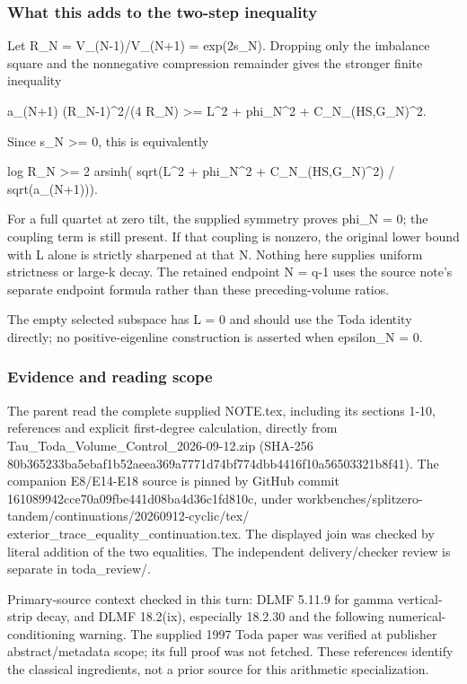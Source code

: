 \subsubsection{What this adds to the two-step
inequality}\label{toda_parent_join:what-this-adds-to-the-two-step-inequality}

Let R\_N = V\_(N-1)/V\_(N+1) = exp(2s\_N). Dropping only the imbalance square and the nonnegative
compression remainder gives the stronger finite inequality

a\_(N+1) (R\_N-1)\^{}2/(4 R\_N) \textgreater= L\^{}2 + phi\_N\^{}2 +
\textbar\textbar C\_N\textbar\textbar\_(HS,G\_N)\^{}2.

Since s\_N \textgreater= 0, this is equivalently

log R\_N \textgreater= 2 arsinh( sqrt(L\^{}2 + phi\_N\^{}2 +
\textbar\textbar C\_N\textbar\textbar\_(HS,G\_N)\^{}2) / sqrt(a\_(N+1))).

For a full quartet at zero tilt, the supplied symmetry proves phi\_N = 0; the coupling term is still
present. If that coupling is nonzero, the original lower bound with L alone is strictly sharpened at
that N. Nothing here supplies uniform strictness or large-k decay. The retained endpoint N = q-1
uses the source note's separate endpoint formula rather than these preceding-volume ratios.

The empty selected subspace has L = 0 and should use the Toda identity directly; no
positive-eigenline construction is asserted when epsilon\_N = 0.

\subsubsection{Evidence and reading scope}\label{toda_parent_join:evidence-and-reading-scope}

The parent read the complete supplied NOTE.tex, including its sections 1-10, references and explicit
first-degree calculation, directly from Tau\_Toda\_Volume\_Control\_2026-09-12.zip (SHA-256
80b365233ba5ebaf1b52aeea369a7771d74bf774dbb4416f10a56503321b8f41). The companion E8/E14-E18 source
is pinned by GitHub commit 161089942cce70a09fbe441d08ba4d36c1fd810c, under
workbenches/splitzero-tandem/continuations/20260912-cyclic/tex/
exterior\_trace\_equality\_continuation.tex. The displayed join was checked by literal addition of
the two equalities. The independent delivery/checker review is separate in toda\_review/.

Primary-source context checked in this turn: DLMF 5.11.9 for gamma vertical-strip decay, and DLMF
18.2(ix), especially 18.2.30 and the following numerical-conditioning warning. The supplied 1997
Toda paper was verified at publisher abstract/metadata scope; its full proof was not fetched. These
references identify the classical ingredients, not a prior source for this arithmetic
specialization.
